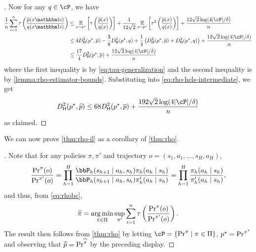 \begin{proof}[]
Now for any $q \in \cP$, we have
\begin{align}
\frac{1}{n}\sum_{i=1}^n\tau\left(\frac{\pbar(x\ind{i})}{q(x\ind{i})}\right)
&\leq \EE_{x \sim \pstar}\left[\tau\left(\frac{\pbar(x)}{q(x)}\right)\right] + \frac{1}{12\sqrt{2}} \EE_{x \sim \pstar}\left[\tau^2\left(\frac{\pbar(x)}{q(x)}\right)\right] + \frac{12\sqrt{2}\log(4|\cP|/\delta)}{n} \\ 
&\leq 4\Dhels{\pstar}{\pbar} - \frac{3}{8} \Dhels{\pstar}{q} + \frac{1}{4}\left(\Dhels{\pstar}{\pbar} + \Dhels{\pstar}{q}\right) + \frac{12\sqrt{2}\log(4|\cP|/\delta)}{n} \\ 
&\leq \frac{17}{4}\Dhels{\pstar}{\pbar} + \frac{12\sqrt{2}\log(4|\cP|/\delta)}{n}
\end{align}
where the first inequality is by \cref{eq:tau-generalization} and the second inequality is by \cref{lemma:rho-estimator-bounds}. Substituting into \cref{eq:rho-hels-intermediate}, we get
\[\Dhels{\pstar}{\wh p} \leq 68 \Dhels{\pstar}{\pbar} + \frac{192\sqrt{2}\log(4|\cP|/\delta)}{n}\]
as claimed.
\end{proof}
We can now prove \cref{thm:rho-il} as a corollary of \cref{thm:rho}.
%
\begin{proof}[]
  Note that for any policies $\pi,\pi'$ and trajectory $o=(s_1,a_1,\dots,s_H,a_H)$,
  \begin{align}
    \frac{\pp^\pi(\obs)}{\pp^{\pi'}(\obs)} = \prod_{h = 1}^H \frac{\bbP_h(s_{h+1} \mid{} a_h, s_h) \pi_h(a_h \mid{} s_h)}{\bbP_h(s_{h+1} \mid{} a_h, s_h) \pi_h'(a_h \mid{} s_h)} = \prod_{h = 1}^H \frac{\pi_h(a_h \mid{} s_h)}{\pi_h'(a_h \mid{} s_h)},
  \end{align}
  and thus, from \cref{eq:rhobc},
  \begin{align}
    \widehat{\pi} = \operatorname*{arg\,min}_{\pi \in \Pi} \sup_{\pi'}\sum_{i = 1}^n \tau\left( \frac{\operatorname{Pr}^\pi(o)}{\operatorname{Pr}^{\pi'}(o)} \right).
  \end{align}
  The result then follows from \cref{thm:rho} by letting $\cP = \left\{ \pp^{\pi} 
  \mid{} \pi \in \Pi \right\}$, $p^\star = \operatorname{Pr}^{\pi^{\star}}$ and observing that $\widehat{p} = \operatorname{Pr}^{\widehat{\pi}}$ by the preceding display.
\end{proof}

%




